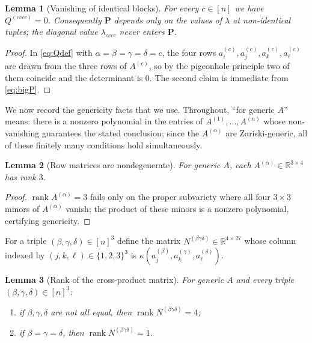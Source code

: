 \documentclass[12pt]{article}
\DeclareMathOperator{\rank}{rank}
\newcommand{\bR}{\mathbb{R}}
\newtheorem{lemma}{Lemma}
\theoremstyle{definition}
\begin{document}
\begin{lemma}[Vanishing of identical blocks]\label{lem:diag}
For every $c\in[n]$ we have $Q^{(cccc)}=0$.  Consequently $\mathbf P$ depends only
on the values of $\lambda$ at non-identical tuples; the diagonal value
$\lambda_{cccc}$ never enters $\mathbf P$.
\end{lemma}

\begin{proof}
In \eqref{eq:Qdef} with $\alpha=\beta=\gamma=\delta=c$, the four rows
$a^{(c)}_i,a^{(c)}_j,a^{(c)}_k,a^{(c)}_\ell$ are drawn from the three rows of
$A^{(c)}$, so by the pigeonhole principle two of them coincide and the determinant
is $0$.  The second claim is immediate from \eqref{eq:bigP}.
\end{proof}

\medskip
We now record the genericity facts that we use.  Throughout, ``for generic
$A$'' means: there is a nonzero polynomial in the entries of
$A^{(1)},\dots,A^{(n)}$ whose non-vanishing guarantees the stated conclusion;
since the $A^{(\alpha)}$ are Zariski-generic, all of these finitely many
conditions hold simultaneously.

\begin{lemma}[Row matrices are nondegenerate]\label{lem:Arank}
For generic $A$, each $A^{(\alpha)}\in\bR^{3\times4}$ has rank $3$.
\end{lemma}

\begin{proof}
$\rank A^{(\alpha)}=3$ fails only on the proper subvariety where all four
$3\times3$ minors of $A^{(\alpha)}$ vanish; the product of these minors is a
nonzero polynomial, certifying genericity.
\end{proof}

For a triple $(\beta,\gamma,\delta)\in[n]^3$ define the matrix
$N^{(\beta\gamma\delta)}\in\bR^{4\times27}$ whose column indexed by
$(j,k,\ell)\in\{1,2,3\}^3$ is $\kappa(a^{(\beta)}_j,a^{(\gamma)}_k,a^{(\delta)}_\ell)$.

\begin{lemma}[Rank of the cross-product matrix]\label{lem:Nrank}
For generic $A$ and every triple $(\beta,\gamma,\delta)\in[n]^3$:
\begin{enumerate}[label=\textup{(\roman*)}]
\item if $\beta,\gamma,\delta$ are not all equal, then $\rank N^{(\beta\gamma\delta)}=4$;
\item if $\beta=\gamma=\delta$, then $\rank N^{(\beta\gamma\delta)}=1$.
\end{enumerate}
\end{lemma}
\end{document}
